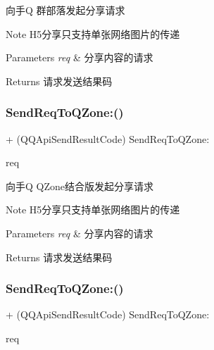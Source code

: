 向手Q 群部落发起分享请求 \begin{DoxyNote}{Note}
H5分享只支持单张网络图片的传递 
\end{DoxyNote}

\begin{DoxyParams}{Parameters}
{\em req} & 分享内容的请求 \\
\hline
\end{DoxyParams}
\begin{DoxyReturn}{Returns}
请求发送结果码 
\end{DoxyReturn}
\mbox{\label{interface_q_q_api_interface_a81c51681c6188b60829f9200fe3d2368}} 
\subsubsection{\texorpdfstring{Send\+Req\+To\+Q\+Zone\+:()}{SendReqToQZone:()}\hspace{0.1cm}{\footnotesize\ttfamily [1/2]}}
{\footnotesize\ttfamily + (Q\+Q\+Api\+Send\+Result\+Code) Send\+Req\+To\+Q\+Zone\+: \begin{DoxyParamCaption}\item[{(\mbox{\hyperlink{interface_q_q_base_req}{Q\+Q\+Base\+Req}} $\ast$)}]{req }\end{DoxyParamCaption}}

向手Q Q\+Zone结合版发起分享请求 \begin{DoxyNote}{Note}
H5分享只支持单张网络图片的传递 
\end{DoxyNote}

\begin{DoxyParams}{Parameters}
{\em req} & 分享内容的请求 \\
\hline
\end{DoxyParams}
\begin{DoxyReturn}{Returns}
请求发送结果码 
\end{DoxyReturn}
\mbox{\label{interface_q_q_api_interface_a81c51681c6188b60829f9200fe3d2368}} 
\subsubsection{\texorpdfstring{Send\+Req\+To\+Q\+Zone\+:()}{SendReqToQZone:()}\hspace{0.1cm}{\footnotesize\ttfamily [2/2]}}
{\footnotesize\ttfamily + (Q\+Q\+Api\+Send\+Result\+Code) Send\+Req\+To\+Q\+Zone\+: \begin{DoxyParamCaption}\item[{(\mbox{\hyperlink{interface_q_q_base_req}{Q\+Q\+Base\+Req}} $\ast$)}]{req }\end{DoxyParamCaption}}

